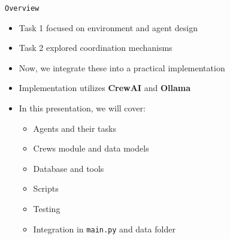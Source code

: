 \begin{frame}[fragile]{\texttt{Overview}}
    \begin{itemize}
        \item Task 1 focused on environment and agent design
        \item Task 2 explored coordination mechanisms
        \item Now, we integrate these into a practical implementation
        \item Implementation utilizes \textbf{CrewAI} and \textbf{Ollama}
        \item In this presentation, we will cover:
        \begin{itemize}
            \item Agents and their tasks
            \item Crews module and data models
            \item Database and tools
            \item Scripts
            \item Testing
            \item Integration in \texttt{main.py} and data folder
        \end{itemize}
    \end{itemize}
\end{frame}
